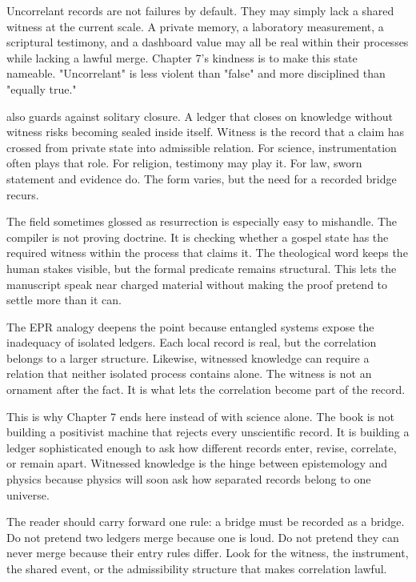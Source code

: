 Uncorrelant records are not failures by default. They may simply lack a shared
witness at the current scale. A private memory, a laboratory measurement, a
scriptural testimony, and a dashboard value may all be real within their
processes while lacking a lawful merge. Chapter 7's kindness is to make this
state nameable. "Uncorrelant" is less violent than "false" and more disciplined
than "equally true."

 also guards against solitary closure. A ledger that closes on
knowledge without witness risks becoming sealed inside itself. Witness is the
record that a claim has crossed from private state into admissible relation.
For science, instrumentation often plays that role. For religion, testimony may
play it. For law, sworn statement and evidence do. The form varies, but the
need for a recorded bridge recurs.

The field sometimes glossed as resurrection is especially easy to mishandle.
The compiler is not proving doctrine. It is checking whether a gospel state has
the required witness within the process that claims it. The theological word
keeps the human stakes visible, but the formal predicate remains structural.
This lets the manuscript speak near charged material without making the proof
pretend to settle more than it can.

The EPR analogy deepens the point because entangled systems expose the
inadequacy of isolated ledgers. Each local record is real, but the correlation
belongs to a larger structure. Likewise, witnessed knowledge can require a
relation that neither isolated process contains alone. The witness is not an
ornament after the fact. It is what lets the correlation become part of the
record.

This is why Chapter 7 ends here instead of with science alone. The book is not
building a positivist machine that rejects every unscientific record. It is
building a ledger sophisticated enough to ask how different records enter,
revise, correlate, or remain apart. Witnessed knowledge is the hinge between
epistemology and physics because physics will soon ask how separated records
belong to one universe.

The reader should carry forward one rule: a bridge must be recorded as a
bridge. Do not pretend two ledgers merge because one is loud. Do not pretend
they can never merge because their entry rules differ. Look for the witness,
the instrument, the shared event, or the admissibility structure that makes
correlation lawful.

